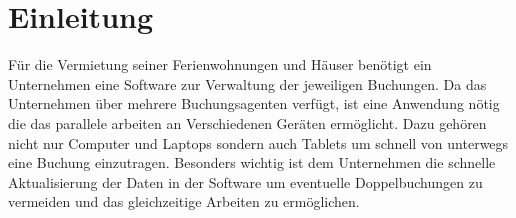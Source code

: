 \chapter{Einleitung}
Für die Vermietung seiner Ferienwohnungen und Häuser benötigt ein Unternehmen eine Software zur Verwaltung der jeweiligen Buchungen. Da das Unternehmen über mehrere Buchungsagenten verfügt, ist eine Anwendung nötig die das parallele arbeiten an Verschiedenen Geräten ermöglicht. Dazu gehören nicht nur Computer und Laptops sondern auch Tablets um schnell von unterwegs eine Buchung einzutragen. Besonders wichtig ist dem Unternehmen die schnelle Aktualisierung der Daten in der Software um eventuelle Doppelbuchungen zu vermeiden und das gleichzeitige Arbeiten zu ermöglichen.